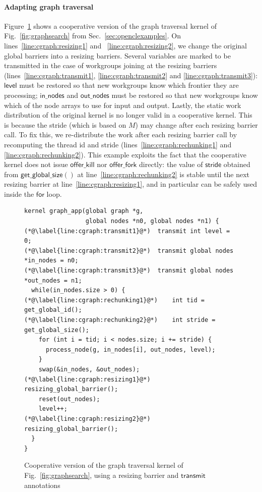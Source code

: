 \documentclass[numbers,nocopyrightspace,10pt]{sigplanconf}
\newcommand{\myfig}{Fig.~}
\newcommand{\myfiglong}{Figure~}
\newcommand{\mysec}{Sec.~}
\newcommand{\transmit}{\mathsf{transmit}}
\newcommand{\offerfork}{\mathsf{offer\_fork}}
\newcommand{\offerkill}{\mathsf{offer\_kill}}
\newcommand{\getglobalsize}{\mathsf{get\_global\_size}}
\newcommand{\keyword}[1]{\mathsf{#1}}
\begin{document}
\paragraph{Adapting graph traversal} 
\myfiglong\ref{fig:cgraphsearch} shows a cooperative version of the
graph traversal kernel of \myfig\ref{fig:graphsearch} from
\mysec\ref{sec:openclexamples}.  On lines~\ref{line:cgraph:resizing1}
and ~\ref{line:cgraph:resizing2}, we change the original global
barriers into a resizing barriers. Several variables are marked to be
transmitted in the case of workgroups joining at the resizing barriers
(lines~\ref{line:cgraph:transmit1}, \ref{line:cgraph:transmit2} and
\ref{line:cgraph:transmit3}): $\keyword{level}$ must be restored so
that new workgroups know which frontier they are processing;
$\keyword{in\_nodes}$ and $\keyword{out\_nodes}$ must be restored so
that new workgroups know which of the node arrays to use for input and
output. Lastly, the static work distribution of the original kernel is
no longer valid in a cooperative kernel. This is because the stride
(which is based on $M$) may change after each resizing barrier
call. To fix this, we re-distribute the work after each resizing
barrier call by recomputing the thread id and stride
(lines~\ref{line:cgraph:rechunking1} and
\ref{line:cgraph:rechunking2}). This example exploits the fact that
the cooperative kernel does not issue $\offerkill$ nor $\offerfork$
directly: the value of $\keyword{stride}$ obtained from
$\getglobalsize()$ at line~\ref{line:cgraph:rechunking2} is stable
until the next resizing barrier at line~\ref{line:cgraph:resizing1},
and in particular can be safely used inside the $\keyword{for}$ loop.

\begin{figure}

\begin{lstlisting}
kernel graph_app(global graph *g, 
                 global nodes *n0, global nodes *n1) {
(*@\label{line:cgraph:transmit1}@*)  transmit int level = 0;
(*@\label{line:cgraph:transmit2}@*)  transmit global nodes *in_nodes = n0;
(*@\label{line:cgraph:transmit3}@*)  transmit global nodes *out_nodes = n1;
  while(in_nodes.size > 0) {
(*@\label{line:cgraph:rechunking1}@*)    int tid = get_global_id();
(*@\label{line:cgraph:rechunking2}@*)    int stride = get_global_size();
    for (int i = tid; i < nodes.size; i += stride) {
      process_node(g, in_nodes[i], out_nodes, level);
    }
    swap(&in_nodes, &out_nodes);
(*@\label{line:cgraph:resizing1}@*)    resizing_global_barrier();
    reset(out_nodes);
    level++;
(*@\label{line:cgraph:resizing2}@*)    resizing_global_barrier();
  }
}
\end{lstlisting}
\caption{Cooperative version of the graph traversal kernel of \myfig\ref{fig:graphsearch}, using a resizing barrier and $\transmit$ annotations}\label{fig:cgraphsearch}
\end{figure}
\end{document}
